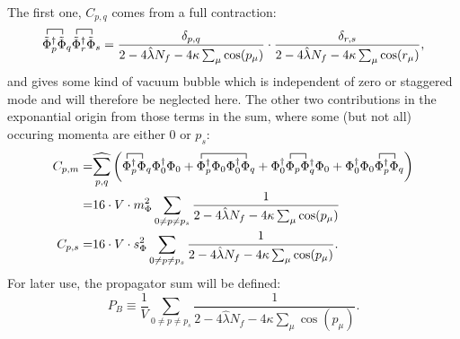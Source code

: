 The first one, $C_{p,q}$ comes from a full contraction:
\begin{equation}\label{eq:CEP_firstOrderLambda_VacuumBubble}
 \contraction{}{\tilde\Phi}{{}_p^{\dagger}}{\tilde\Phi} \tilde\Phi_p^{\dagger} \tilde\Phi_q
  \contraction{}{\tilde\Phi}{{}_r^{\dagger}}{\tilde\Phi} \tilde\Phi_r^{\dagger} \tilde\Phi_s = 
    \frac{ \delta_{p,q}}{2 - 4 \hat\lambda N_f - 4 \kappa \sum_{\mu} \cos(p_{\mu}) } \cdot 
    \frac{ \delta_{r,s}}{2 - 4 \hat\lambda N_f - 4 \kappa \sum_{\mu} \cos(r_{\mu}) },
\end{equation}
and gives some kind of vacuum bubble which is independent of zero or staggered mode 
and will therefore be neglected here.
The other two contributions in the exponantial origin from those terms in the sum, where some (but not all) occuring momenta are either $0$ or $p_s$:
\begin{align}\label{eq:CEP_firstOrderLambda_zeroModeContribution}
 C_{p,m}=& \widehat{\sum\limits_{p,q}} \left( 
             \contraction{}{\Phi}{{}_p^{\dagger}}{\Phi}                              \Phi_p^{\dagger} \Phi_q \Phi_0^{\dagger} \Phi_0
           + \contraction{}{\Phi}{{}_p^{\dagger} \Phi_0 \Phi_0^{\dagger}}{\Phi}      \Phi_p^{\dagger} \Phi_0 \Phi_0^{\dagger} \Phi_q
           + \contraction{\Phi_0^{\dagger} }{\Phi}{{}_p}{\Phi}                       \Phi_0^{\dagger} \Phi_p \Phi_q^{\dagger} \Phi_0
           + \contraction{\Phi_0^{\dagger} \Phi_0 }{\Phi}{{}_p^{\dagger}}{\Phi}      \Phi_0^{\dagger} \Phi_0 \Phi_p^{\dagger} \Phi_q
            \right) \nonumber \\
        =& 16 \cdot V \cdot m_{\Phi}^2 \sum\limits_{0\neq p \neq p_s} \frac{1}{2 - 4 \hat\lambda N_f - 4 \kappa \sum_{\mu} \cos(p_{\mu})} \\
  \label{eq:CEP_firstOrderLambda_staggeredModeContribution}
 C_{p,s}=& 16 \cdot V \cdot s_{\Phi}^2 \sum\limits_{0\neq p \neq p_s} \frac{1}{2 - 4 \hat\lambda N_f - 4 \kappa \sum_{\mu} \cos(p_{\mu})}.
\end{align}
For later use, the propagator sum will be defined:
\begin{equation}\label{eq:bosonicPropagatorSum_CEP}
 P_B \equiv \frac{1}{V}\sum\limits_{0\neq p\neq p_s} \frac{1}{2 - 4 \hat\lambda N_f - 4 \kappa \sum_{\mu} \cos(p_{\mu})}.
\end{equation}

